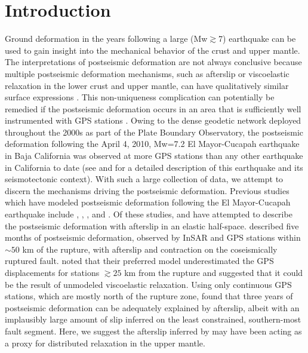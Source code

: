 \section{Introduction}
Ground deformation in the years following a large (Mw$\gtrsim$7)
earthquake can be used to gain insight into the mechanical behavior of
the crust and upper mantle. The interpretations of postseismic
deformation are not always conclusive because multiple postseismic
deformation mechanisms, such as afterslip or viscoelastic relaxation
in the lower crust and upper mantle, can have qualitatively similar
surface expressions \citep[e.g.,][]{Savage1990}. This non-uniqueness
complication can potentially be remedied if the postseismic
deformation occurs in an area that is sufficiently well instrumented
with GPS stations \citep{Hearn2003}.  Owing to the dense geodetic
network deployed throughout the 2000s as part of the Plate Boundary
Observatory, the postseismic deformation following the April 4, 2010,
Mw=7.2 El Mayor-Cucapah earthquake in Baja California was observed at
more GPS stations than any other earthquake in California to date (see
\citet{Hauksson2011} and \citet{Fletcher2014} for a detailed
description of this earthquake and its seismotectonic context).  With
such a large collection of data, we attempt to discern the mechanisms
driving the postseismic deformation. Previous studies which have
modeled postseismic deformation following the El Mayor-Cucapah
earthquake include \citet{Pollitz2012}, \citet{Gonzalez-ortega2014},
\citet{Spinler2015}, and \citet{Rollins2015}. Of these studies,
\citet{Gonzalez-ortega2014} and \citet{Rollins2015} have attempted to
describe the postseismic deformation with afterslip in an elastic
half-space.  \citet{Gonzalez-ortega2014} described five months of
postseismic deformation, observed by InSAR and GPS stations within
${\sim}50$ km of the rupture, with afterslip and contraction on the
coseismically ruptured fault. \citet{Gonzalez-ortega2014} noted that
their preferred model underestimated the GPS displacements for
stations $\gtrsim 25$ km from the rupture and suggested that it could
be the result of unmodeled viscoelastic relaxation.  Using only
continuous GPS stations, which are mostly north of the rupture zone,
\citet{Rollins2015} found that three years of postseismic deformation
can be adequately explained by afterslip, albeit with an implausibly
large amount of slip inferred on the least constrained, southern-most
fault segment. Here, we suggest the afterslip inferred by
\citet{Rollins2015} may have been acting as a proxy for distributed
relaxation in the upper mantle.

